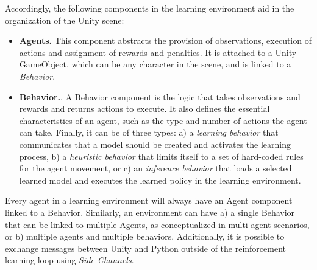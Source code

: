 Accordingly, the following components in the learning environment aid in the organization of the Unity scene: 
\begin{itemize}
    \item \textbf{Agents.} This component abstracts the provision of observations, execution of actions and assignment of rewards and penalties.
    It is attached to a Unity GameObject, which can be any character in the scene, and is linked to a \textit{Behavior}.
    \item \textbf{Behavior.}. A Behavior component is the logic that takes observations and rewards and returns actions to execute. 
    It also defines the essential characteristics of an agent, such as the type and number of actions the agent can take.
    Finally, it can be of three types: a) a \textit{learning behavior} that communicates that a model should be created and activates the learning process, b) a \textit{heuristic behavior} that limits itself to a set of hard-coded rules for the agent movement, or c) an \textit{inference behavior} that loads a selected learned model and executes the learned policy in the learning environment.
    
    

\end{itemize}

Every agent in a learning environment will always have an Agent component linked to a Behavior. Similarly, an environment can have a) a single Behavior that can be linked to multiple Agents, as conceptualized in multi-agent scenarios, or b) multiple agents and multiple behaviors. Additionally, it is possible to exchange messages between Unity and Python outside of the reinforcement learning loop using \textit{Side Channels}. 

